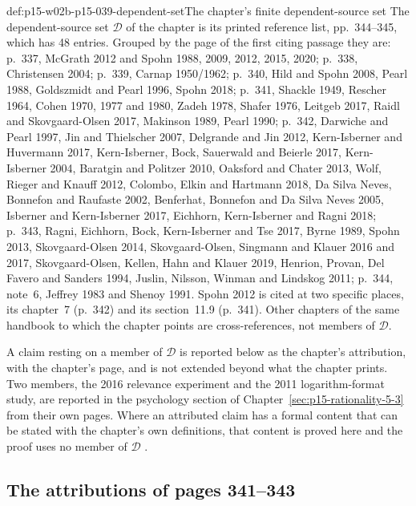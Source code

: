 \begin{hbconvention}{def:p15-w02b-p15-039-dependent-set}{The chapter's finite dependent-source set}
The dependent-source set \(\mathcal D\) of the chapter is its printed
reference list, pp.~344--345, which has 48 entries.  Grouped by the page of
the first citing passage they are:
p.~337, McGrath 2012 and Spohn 1988, 2009, 2012, 2015, 2020;
p.~338, Christensen 2004;
p.~339, Carnap 1950/1962;
p.~340, Hild and Spohn 2008, Pearl 1988, Goldszmidt and Pearl 1996,
Spohn 2018;
p.~341, Shackle 1949, Rescher 1964, Cohen 1970, 1977 and 1980, Zadeh 1978,
Shafer 1976, Leitgeb 2017, Raidl and Skovgaard-Olsen 2017, Makinson 1989,
Pearl 1990;
p.~342, Darwiche and Pearl 1997, Jin and Thielscher 2007, Delgrande and
Jin 2012, Kern-Isberner and Huvermann 2017, Kern-Isberner, Bock, Sauerwald
and Beierle 2017, Kern-Isberner 2004, Baratgin and Politzer 2010, Oaksford
and Chater 2013, Wolf, Rieger and Knauff 2012, Colombo, Elkin and Hartmann
2018, Da Silva Neves, Bonnefon and Raufaste 2002, Benferhat, Bonnefon and
Da Silva Neves 2005, Isberner and Kern-Isberner 2017, Eichhorn,
Kern-Isberner and Ragni 2018;
p.~343, Ragni, Eichhorn, Bock, Kern-Isberner and Tse 2017, Byrne 1989,
Spohn 2013, Skovgaard-Olsen 2014, Skovgaard-Olsen, Singmann and Klauer 2016
and 2017, Skovgaard-Olsen, Kellen, Hahn and Klauer 2019, Henrion, Provan,
Del Favero and Sanders 1994, Juslin, Nilsson, Winman and Lindskog 2011;
p.~344, note~6, Jeffrey 1983 and Shenoy 1991.
Spohn 2012 is cited at two specific places, its chapter~7 (p.~342) and its
section~11.9 (p.~341).  Other chapters of the same handbook to which the
chapter points are cross-references, not members of \(\mathcal D\).

A claim resting on a member of \(\mathcal D\) is reported below as the
chapter's attribution, with the chapter's page, and is not extended beyond
what the chapter prints.  Two members, the 2016 relevance experiment and
the 2011 logarithm-format study, are reported in the psychology section of
Chapter~\ref{sec:p15-rationality-5-3} from
their own pages.  Where an attributed claim has a formal content that can
be stated with the chapter's own definitions, that content is proved here
and the proof uses no member of \(\mathcal D\)
\parencite[pp.~337--345]{KernIsbernerSkovgaardOlsenSpohn2021Ranking}.
\end{hbconvention}

\subsection{The attributions of pages 341--343}
\label{sec:p15-w02b-p15-039-attributions}

